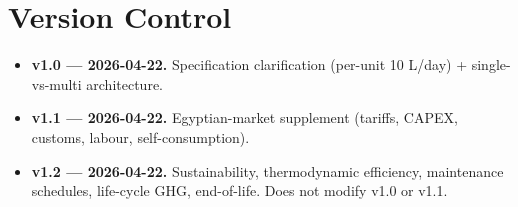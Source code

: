 \documentclass[11pt,a4paper]{article}
\begin{document}
\section*{Version Control}
\begin{itemize}[leftmargin=*]
  \item \textbf{v1.0 --- 2026-04-22.} Specification clarification (per-unit 10 L/day) + single-vs-multi architecture.
  \item \textbf{v1.1 --- 2026-04-22.} Egyptian-market supplement (tariffs, CAPEX, customs, labour, self-consumption).
  \item \textbf{v1.2 --- 2026-04-22.} Sustainability, thermodynamic efficiency, maintenance schedules, life-cycle GHG, end-of-life. Does not modify v1.0 or v1.1.
\end{itemize}
\end{document}
